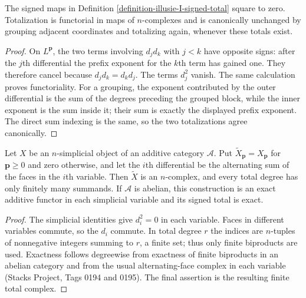 \begin{lemma}
\label{lemma-illusie-I-signed-total-differential}
The signed maps in Definition
\ref{definition-illusie-I-signed-total} square to zero. Totalization is
functorial in maps of $n$-complexes and is canonically unchanged by grouping
adjacent coordinates and totalizing again, whenever these totals exist.
\end{lemma}

\begin{proof}
On $L^{\mathbf p}$, the two terms involving $d_jd_k$ with $j<k$ have
opposite signs: after the $j$th differential the prefix exponent for the
$k$th term has gained one. They therefore cancel because
$d_jd_k=d_kd_j$. The terms
$d_j^2$ vanish. The same calculation proves functoriality. For a grouping,
the exponent contributed by the outer differential is the sum of the
degrees preceding the grouped block, while the inner exponent is the sum
inside it; their sum is exactly the displayed prefix exponent. The direct
sum indexing is the same, so the two totalizations agree canonically.
\end{proof}

\begin{lemma}
\label{lemma-illusie-I-multisimplicial-chains}
Let $X$ be an $n$-simplicial object of an additive category $\mathcal A$.
Put $\widetilde X_{\mathbf p}=X_{\mathbf p}$ for $\mathbf p\geq0$ and
zero otherwise, and let the $i$th differential be the alternating sum of
the faces in the $i$th variable. Then $\widetilde X$ is an $n$-complex,
and every total degree has only finitely many summands. If $\mathcal A$ is
abelian, this construction is an exact additive functor in each simplicial
variable and its signed total is exact.
\end{lemma}

\begin{proof}
The simplicial identities give $d_i^2=0$ in each variable. Faces in
different variables commute, so the $d_i$ commute. In total degree $r$ the
indices are $n$-tuples of nonnegative integers summing to $r$, a finite set;
thus only finite biproducts are used. Exactness follows degreewise from
exactness of finite biproducts in an abelian category and from the usual
alternating-face complex in each variable (Stacks Project, Tags 0194 and
0195). The final assertion is the resulting finite total complex.
\end{proof}

